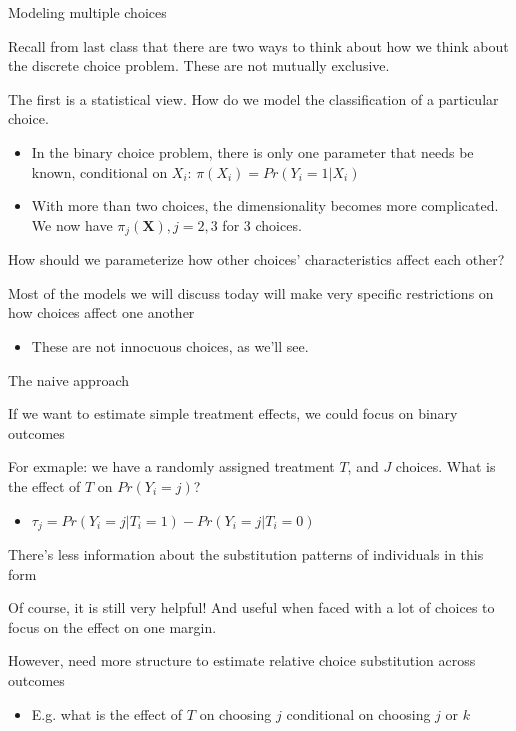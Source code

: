 \documentclass[notes,11pt, aspectratio=169]{beamer}
\newenvironment{wideitemize}{\itemize\addtolength{\itemsep}{10pt}}{\enditemize}
\begin{document}
\begin{frame}{Modeling multiple choices}
    \begin{wideitemize}
    \item Recall from last class that there are two ways to think
      about how we think about the discrete choice problem. These are not
      mutually exclusive.
    \item The first is a statistical view. How do we model the
      classification of a particular choice.
      \begin{itemize}
      \item In the binary choice problem, there is only one parameter
        that needs be known, conditional on $X_{i}$: 
        $\pi(X_{i}) = Pr(Y_{i} = 1 |X _{i})$
      \item With more than two choices, the dimensionality becomes
        more complicated.  We now have
        $\pi_{j}(\mathbf{X}), j=2,3$ for 3 choices. 
      \end{itemize}
    \item How should we parameterize how other choices' characteristics
      affect each other?
    \item Most of the models we will discuss today will make very
      specific restrictions on how choices affect one another
      \begin{itemize}
      \item These are not innocuous choices, as we'll see.
      \end{itemize}
  \end{wideitemize}
\end{frame}


\begin{frame}{The naive approach}
  \begin{wideitemize}
  \item If we want to estimate simple treatment effects, we could
    focus on binary outcomes
  \item For exmaple: we have a randomly assigned treatment $T$, and
    $J$ choices. What is the effect of $T$ on $Pr(Y_{i} = j)$?
  \begin{itemize}
  \item    $\tau_{j} = Pr(Y_{i} = j | T_{i} = 1) -Pr(Y_{i} = j | T_{i} = 0)$
  \end{itemize}
\item   There's less information about the substitution
  patterns of individuals in this form
\item Of course, it is still very helpful! And useful when faced with
  a lot of choices to focus on the effect on one margin.
\item However, need more structure to estimate relative choice
  substitution across outcomes
  \begin{itemize}
  \item E.g. what is the effect of $T$ on choosing $j$ conditional on
    choosing $j$ or $k$
  \end{itemize}
  \end{wideitemize}
\end{frame}
\end{document}
